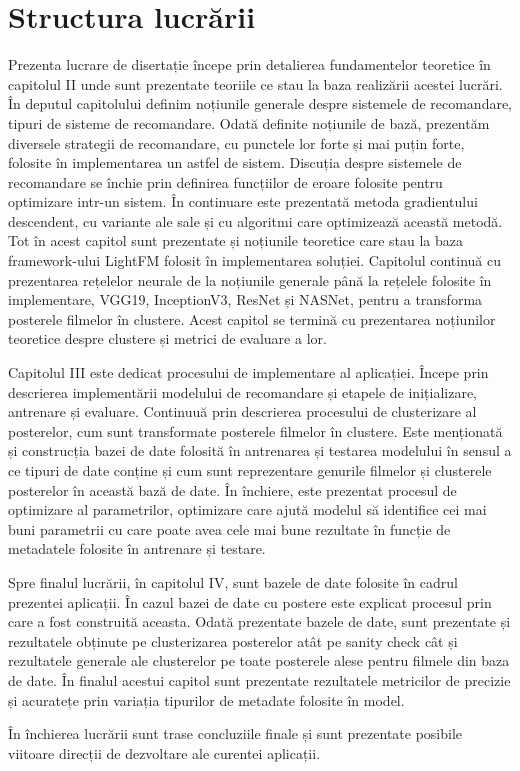 \section{Structura lucrării}
Prezenta lucrare de disertație începe prin detalierea fundamentelor teoretice în capitolul II unde sunt prezentate teoriile ce stau la baza realizării acestei lucrări. În deputul capitolului definim noțiunile generale despre sistemele de recomandare, tipuri de sisteme de recomandare. Odată definite noțiunile de bază, prezentăm diversele strategii de recomandare, cu punctele lor forte și mai puțin forte, folosite în implementarea un astfel de sistem. Discuția despre sistemele de recomandare se închie prin definirea funcțiilor de eroare folosite pentru optimizare intr-un sistem. În continuare este prezentată metoda gradientului descendent, cu variante ale sale și cu algoritmi care optimizează această metodă. Tot în acest capitol sunt prezentate și noțiunile teoretice care stau la baza framework-ului LightFM folosit în implementarea soluției. Capitolul continuă cu prezentarea rețelelor neurale de la noțiunile generale până la rețelele folosite în implementare, VGG19, InceptionV3, ResNet și NASNet, pentru a transforma posterele filmelor în clustere. Acest capitol se termină cu prezentarea noțiunilor teoretice despre clustere și metrici de evaluare a lor.

Capitolul III este dedicat procesului de implementare al aplicației. Începe prin descrierea implementării modelului de recomandare și etapele de inițializare, antrenare și evaluare. Continuuă prin descrierea procesului de clusterizare al posterelor, cum sunt transformate posterele filmelor în clustere. Este menționată și construcția bazei de date folosită în antrenarea și testarea modelului în sensul a ce tipuri de date conține și cum sunt reprezentare genurile filmelor și clusterele posterelor în această bază de date. În închiere, este prezentat procesul de optimizare al parametrilor, optimizare care ajută modelul să identifice cei mai buni parametrii cu care poate avea cele mai bune rezultate în funcție de metadatele folosite în antrenare și testare.

Spre finalul lucrării, în capitolul IV, sunt bazele de date folosite în cadrul prezentei aplicații. În cazul bazei de date cu postere este explicat procesul prin care a fost construită aceasta. Odată prezentate bazele de date, sunt prezentate și rezultatele obținute pe clusterizarea posterelor atât pe sanity check cât și rezultatele generale ale clusterelor pe toate posterele alese pentru filmele din baza de date. În finalul acestui capitol sunt prezentate rezultatele metricilor de precizie și acuratețe prin variația tipurilor de metadate folosite în model.

În închierea lucrării sunt trase concluziile finale și sunt prezentate posibile viitoare
direcții de dezvoltare ale curentei aplicații.